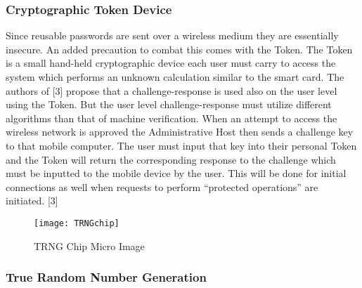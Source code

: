 \documentclass[11pt,onecolumn,cspaper,compsoc]{IEEEtran}
\begin{document}
\subsubsection*{Cryptographic Token Device}

Since reusable passwords are sent over a wireless medium they are essentially insecure. An added precaution to combat this comes with the Token. The Token is a small hand-held cryptographic 
device each user must carry to access the system which performs an unknown calculation similar to the smart card. The authors of [3] propose that a challenge-response is used also on the user 
level using the Token. But the user level challenge-response must utilize different algorithms than that of machine verification. When an attempt to access the wireless network is approved the 
Administrative Host then sends a challenge key to that mobile computer. The user must input that key into their personal Token and the Token will return the corresponding response to the 
challenge which must be inputted to the mobile device by the user. This will be done for initial connections as well when requests to perform “protected operations” are initiated. [3]

\begin{figure}[!h]
  \centering
  \texttt{[image: TRNGchip]}
  \caption{TRNG Chip Micro Image}
  \label{chip}
\end{figure}

\subsubsection*{True Random Number Generation}
\end{document}
